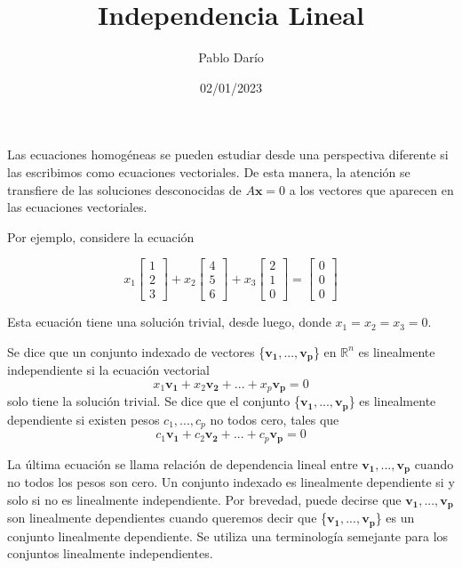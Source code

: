 \documentclass{article}
\title{Independencia Lineal}
\author{Pablo Darío}
\date{02/01/2023}
\begin{document}
\maketitle
Las ecuaciones homogéneas se pueden estudiar desde una perspectiva diferente si las escribimos como ecuaciones vectoriales. De esta manera, la atención se transfiere de las soluciones desconocidas de $A\mathbf{x} = 0$ a los vectores que aparecen en las ecuaciones vectoriales.

Por ejemplo, considere la ecuación 

\begin{equation*}
    x_1\begin{bmatrix} 1\\2\\3 \end{bmatrix}
    + x_2\begin{bmatrix} 4\\5\\6 \end{bmatrix}
    + x_3\begin{bmatrix} 2\\1\\0 \end{bmatrix}
    = \begin{bmatrix} 0\\0\\0 \end{bmatrix}
\end{equation*}

Esta ecuación tiene una solución trivial, desde luego, donde $x_1 = x_2 = x_3 = 0$.

\begin{tcolorbox}[colback=blue!10!white,colframe=blue!60!black,title=Independencia Lineal]
    Se dice que un conjunto indexado de vectores \{$\mathbf{v_1},..., \mathbf{v_p}$\} en $\mathbb{R}^n$ es linealmente independiente si la ecuación vectorial $$x_1\mathbf{v_1} + x_2\mathbf{v_2} + ... + x_p\mathbf{v_p} = 0$$
    solo tiene la solución trivial. Se dice que el conjunto \{$\mathbf{v_1},..., \mathbf{v_p}$\} es linealmente dependiente si existen pesos $c_1, ..., c_p$ no todos cero, tales que $$c_1\mathbf{v_1} + c_2\mathbf{v_2} + ... + c_p\mathbf{v_p} = 0$$
\end{tcolorbox}

La última ecuación se llama relación de dependencia lineal entre $\mathbf{v_1},..., \mathbf{v_p}$ cuando no todos los pesos son cero. Un conjunto indexado es linealmente dependiente si y solo si no es linealmente independiente. Por brevedad, puede decirse que $\mathbf{v_1},..., \mathbf{v_p}$ son linealmente dependientes cuando queremos decir que \{$\mathbf{v_1},..., \mathbf{v_p}$\} es un conjunto linealmente dependiente. Se utiliza una 
terminología semejante para los conjuntos linealmente independientes.
\end{document}
